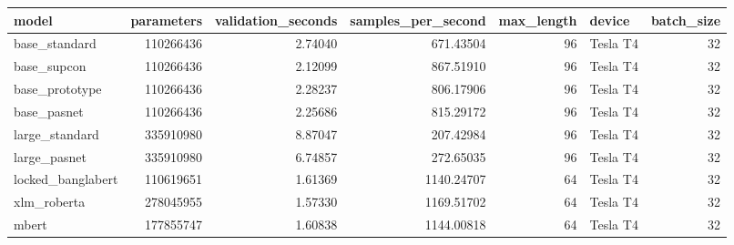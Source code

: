 \begin{tabular}{lrrrrlr}
\toprule
model & parameters & validation\_seconds & samples\_per\_second & max\_length & device & batch\_size \\
\midrule
base\_standard & 110266436 & 2.74040 & 671.43504 & 96 & Tesla T4 & 32 \\
base\_supcon & 110266436 & 2.12099 & 867.51910 & 96 & Tesla T4 & 32 \\
base\_prototype & 110266436 & 2.28237 & 806.17906 & 96 & Tesla T4 & 32 \\
base\_pasnet & 110266436 & 2.25686 & 815.29172 & 96 & Tesla T4 & 32 \\
large\_standard & 335910980 & 8.87047 & 207.42984 & 96 & Tesla T4 & 32 \\
large\_pasnet & 335910980 & 6.74857 & 272.65035 & 96 & Tesla T4 & 32 \\
locked\_banglabert & 110619651 & 1.61369 & 1140.24707 & 64 & Tesla T4 & 32 \\
xlm\_roberta & 278045955 & 1.57330 & 1169.51702 & 64 & Tesla T4 & 32 \\
mbert & 177855747 & 1.60838 & 1144.00818 & 64 & Tesla T4 & 32 \\
\bottomrule
\end{tabular}
